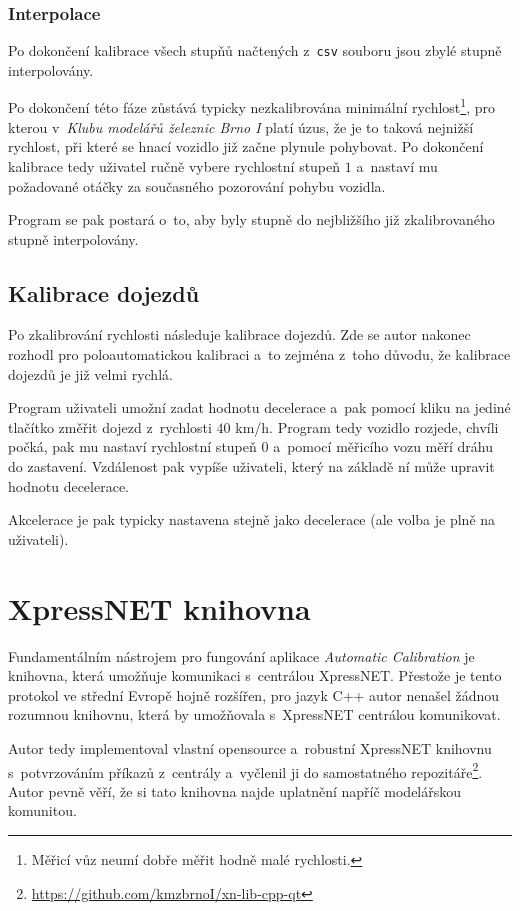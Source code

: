 \subsubsection{Interpolace}

Po dokončení kalibrace všech stupňů načtených z~\texttt{csv} souboru jsou zbylé
stupně interpolovány.

Po dokončení této fáze zůstává typicky nezkalibrována minimální
rychlost\footnote{Měřicí vůz neumí dobře měřit hodně malé rychlosti.}, pro kterou
v~\textit{Klubu modelářů železnic Brno I} platí úzus, že je to taková nejnižší
rychlost, při které se hnací vozidlo již začne plynule pohybovat. Po dokončení
kalibrace tedy uživatel ručně vybere rychlostní stupeň $1$ a~nastaví mu
požadované otáčky za současného pozorování pohybu vozidla.

Program se pak postará o~to, aby byly stupně do nejbližšího již zkalibrovaného
stupně interpolovány.

\subsection{Kalibrace dojezdů}

Po zkalibrování rychlosti následuje kalibrace dojezdů. Zde se autor nakonec
rozhodl pro poloautomatickou kalibraci a~to zejména z~toho důvodu, že kalibrace
dojezdů je již velmi rychlá.

Program uživateli umožní zadat hodnotu decelerace a~pak pomocí kliku na jediné
tlačítko změřit dojezd z~rychlosti $40$ km/h. Program tedy vozidlo rozjede,
chvíli počká, pak mu nastaví rychlostní stupeň $0$ a~pomocí měřicího vozu
měří dráhu do zastavení. Vzdálenost pak vypíše uživateli, který na základě
ní může upravit hodnotu decelerace.

Akcelerace je pak typicky nastavena stejně jako decelerace (ale volba je plně
na uživateli).

\section{XpressNET knihovna}
\label{sec:xn-lib}

Fundamentálním nástrojem pro fungování aplikace \textit{Automatic Calibration}
je knihovna, která umožňuje komunikaci s~centrálou XpressNET. Přestože je tento
protokol ve střední Evropě hojně rozšířen, pro jazyk C++ autor nenašel žádnou
rozumnou knihovnu, která by umožňovala s~XpressNET centrálou komunikovat.

Autor tedy implementoval vlastní opensource a~robustní XpressNET knihovnu
s~potvrzováním příkazů z~centrály a~vyčlenil ji do samostatného
repozitáře\footnote{\url{https://github.com/kmzbrnoI/xn-lib-cpp-qt}}. Autor
pevně věří, že si tato knihovna najde uplatnění napříč modelářskou komunitou.
